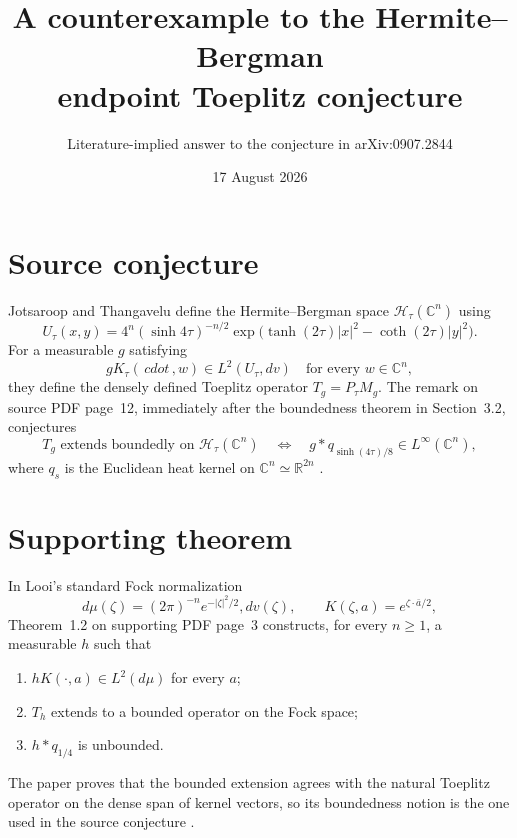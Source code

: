 \documentclass[11pt]{article}
\title{A counterexample to the Hermite--Bergman\\endpoint Toeplitz conjecture}
\author{Literature-implied answer to the conjecture in arXiv:0907.2844}
\date{17 August 2026}
\newcommand{\C}{\mathbb C}
\newcommand{\Hh}{\mathcal H}
\begin{document}
\maketitle

\begin{center}
\end{center}

\section*{Source conjecture}
Jotsaroop and Thangavelu define the Hermite--Bergman space
$\Hh_\tau(\C^n)$ using
\[
 U_\tau(x,y)=4^n(\sinh4\tau)^{-n/2}
 \exp\!\big(\tanh(2\tau)|x|^2-\coth(2\tau)|y|^2\big).
\]
For a measurable $g$ satisfying
\[
 gK_\tau(\,cdot\,,w)\in L^2(U_\tau,dv)
 \quad\text{for every }w\in\C^n, \tag{$*$}
\]
they define the densely defined Toeplitz operator $T_g=P_\tau M_g$.
The remark on source PDF page~12, immediately after the boundedness theorem
in Section~3.2, conjectures
\begin{equation}\label{eq:conj}
 T_g\text{ extends boundedly on }\Hh_\tau(\C^n)
 \quad\Longleftrightarrow\quad
 g*q_{\sinh(4\tau)/8}\in L^\infty(\C^n),
\end{equation}
where $q_s$ is the Euclidean heat kernel on $\C^n\simeq\mathbb R^{2n}$
\cite{JT}.

\section*{Supporting theorem}
In Looi's standard Fock normalization
\[
 d\mu(\zeta)=(2\pi)^{-n}e^{-|\zeta|^2/2},dv(\zeta),
 \qquad K(\zeta,a)=e^{\zeta\cdot\bar a/2},
\]
Theorem~1.2 on supporting PDF page~3 constructs, for every $n\geq1$, a
measurable $h$ such that
\begin{enumerate}
\item $hK(\cdot,a)\in L^2(d\mu)$ for every $a$;
\item $T_h$ extends to a bounded operator on the Fock space;
\item $h*q_{1/4}$ is unbounded.
\end{enumerate}
The paper proves that the bounded extension agrees with the natural Toeplitz
operator on the dense span of kernel vectors, so its boundedness notion is
the one used in the source conjecture \cite{Looi}.
\end{document}
